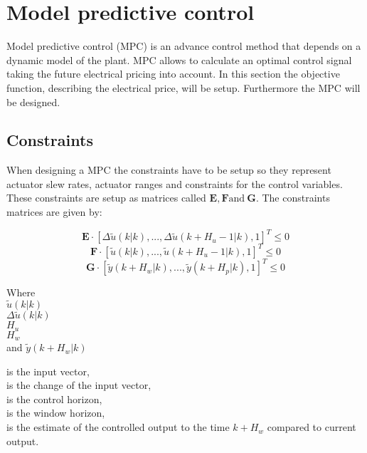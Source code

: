 \section{Model predictive control}

Model predictive control (MPC) is an advance control method that depends on a dynamic model of the plant. MPC allows to calculate an optimal control signal taking the future electrical pricing into account. In this section the objective function, describing the electrical price, will be setup. Furthermore the MPC will be designed. 



\subsection{Constraints}

When designing a MPC the constraints have to be setup so they represent actuator slew rates, actuator ranges and constraints for the control variables. These constraints are setup as matrices called $\pmb{E}, \pmb{F} \text{and} \:\pmb{G}$. The constraints matrices are given by: 

\begin{equation}
\pmb{E} \cdot [\Delta\tilde u(k|k),...,\Delta\tilde u(k+H_u-1|k),1]^T \leq 0 
\label{eq:slewrate}
\end{equation}
\begin{equation}
\pmb{F} \cdot [\tilde u(k|k),...,\tilde u(k+H_u-1|k),1]^T \leq 0 
\label{eq:actranges}
\end{equation}
\begin{equation}
\pmb{G} \cdot [\tilde y(k+H_w|k),...,\tilde y(k+H_p|k),1]^T \leq 0
\label{eq:controlvar}
\end{equation}


 \begin{minipage}[t]{0.20\textwidth}
 Where\\
 \hspace*{8mm} $\tilde u(k|k)$ \\
 \hspace*{8mm} $\Delta\tilde u(k|k)$ \\
 \hspace*{8mm} $H_u$ \\
 \hspace*{8mm} $H_w$ \\
 and \hspace*{0.7mm} $\tilde y(k+H_w|k)$	
 \end{minipage}
 \begin{minipage}[t]{0.68\textwidth}
 \vspace*{2mm}
 is the input vector, \\
 is the change of the input vector, \\
 is the control horizon, \\
 is the window horizon, \\
 is the estimate of the controlled output to the time $k+H_w$ compared to current output.
 \end{minipage}

